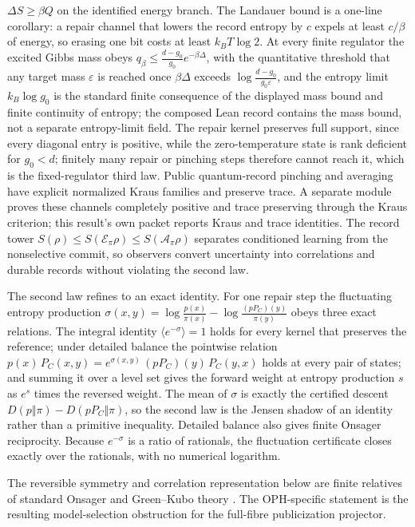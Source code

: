 \documentclass[11pt]{article}
\begin{document}
\(\Delta S\ge\beta Q\) on the identified energy branch. The
Landauer bound is a one-line corollary: a repair channel that lowers
the record entropy by \(c\) expels at least \(c/\beta\) of energy,
so erasing one bit costs at least \(k_BT\log 2\).
At every finite regulator the excited Gibbs mass obeys
\(q_\beta\le\frac{d-g_0}{g_0}e^{-\beta\Delta}\), with the
quantitative threshold that any target mass \(\varepsilon\) is reached
once \(\beta\Delta\) exceeds \(\log\frac{d-g_0}{g_0\varepsilon}\),
and the entropy limit \(k_B\log g_0\) is the standard finite consequence of
the displayed mass bound and finite continuity of entropy; the
composed Lean record contains the mass bound, not a separate entropy-limit
field. The repair kernel preserves
full support, since every diagonal entry is positive, while the
zero-temperature state is rank deficient for \(g_0<d\); finitely many
repair or pinching steps therefore cannot reach it, which is the
fixed-regulator third law. Public quantum-record pinching and averaging have
explicit normalized Kraus families and preserve trace. A separate module
proves these channels completely positive and trace preserving through the
Kraus criterion; this result's own packet reports Kraus and trace identities. The record tower
\(S(\rho)\le S(\mathcal E_\pi\rho)\le S(\mathcal A_\pi\rho)\)
separates conditioned learning from the nonselective commit, so
observers convert uncertainty into correlations and durable records
without violating the second law.

The second law refines to an exact identity. For one repair step the
fluctuating entropy production
\(\sigma(x,y)=\log\frac{p(x)}{\pi(x)}-\log\frac{(pP_C)(y)}{\pi(y)}\)
obeys three exact relations. The integral identity
\(\langle e^{-\sigma}\rangle=1\) holds for every kernel that preserves
the reference; under detailed balance the pointwise relation
\(p(x)\,P_C(x,y)=e^{\sigma(x,y)}\,(pP_C)(y)\,P_C(y,x)\) holds at every
pair of states; and summing it over a level set gives the forward
weight at entropy production \(s\) as \(e^{s}\) times the reversed
weight. The mean of \(\sigma\) is exactly the certified descent
\(D(p\Vert\pi)-D(pP_C\Vert\pi)\), so the second law is the Jensen
shadow of an identity rather than a primitive inequality. Detailed
balance also gives finite Onsager reciprocity. Because \(e^{-\sigma}\)
is a ratio of rationals, the fluctuation certificate closes exactly over
the rationals, with no numerical logarithm.

The reversible symmetry and correlation representation below are finite
relatives of standard Onsager and Green--Kubo theory
\cite{onsager1931,greenKubo}. The OPH-specific statement is the resulting
model-selection obstruction for the full-fibre publicization projector.
\end{document}

